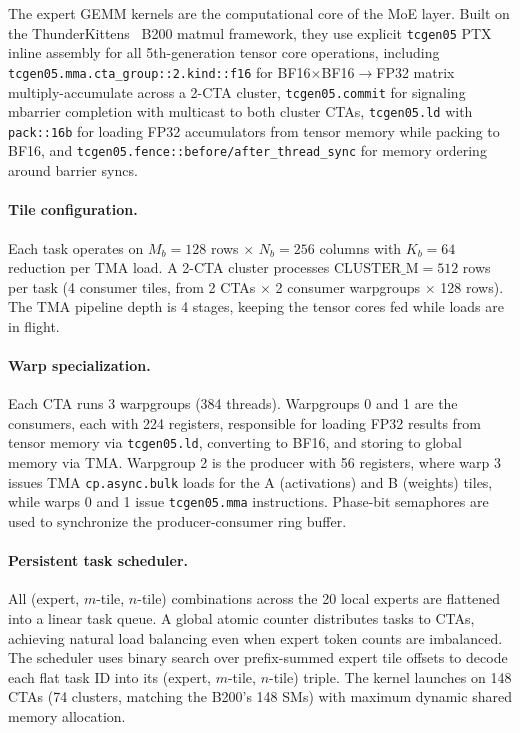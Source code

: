 \documentclass[sigplan,screen]{acmart}
\begin{document}
The expert \newline GEMM kernels are the computational core of the MoE layer. Built on the ThunderKittens~\cite{thunderkittens} B200 matmul framework, they use explicit \texttt{tcgen05} PTX inline assembly for all 5th-generation tensor core operations, including \newline \texttt{tcgen05.mma.cta\_group::2.kind::f16} \newline for BF16$\times$BF16$\rightarrow$FP32 matrix multiply-accumulate across a 2-CTA cluster, \texttt{tcgen05.commit} for signaling mbarrier completion with multicast to both cluster CTAs, \texttt{tcgen05.ld} with \texttt{pack::16b} for loading FP32 accumulators from tensor memory while packing to BF16, and \newline \texttt{tcgen05.fence::before/after\_thread\_sync} for memory ordering around barrier syncs.

\paragraph{Tile configuration.} Each task operates on $M_b = 128$ rows $\times$ $N_b = 256$ columns with $K_b = 64$ reduction per TMA load. A 2-CTA cluster processes $\text{CLUSTER\_M} = 512$ rows per task (4 consumer tiles, from 2 CTAs $\times$ 2 consumer warpgroups $\times$ 128 rows). The TMA pipeline depth is 4 stages, keeping the tensor cores fed while loads are in flight.

\paragraph{Warp specialization.} Each CTA runs 3 warpgroups (384 threads). Warpgroups 0 and 1 are the consumers, each with 224 registers, responsible for loading FP32 results from tensor memory via \texttt{tcgen05.ld}, converting to BF16, and storing to global memory via TMA. Warpgroup 2 is the producer with 56 registers, where warp 3 issues TMA \texttt{cp.async.bulk} loads for the A (activations) and B (weights) tiles, while warps 0 and 1 issue \texttt{tcgen05.mma} instructions. Phase-bit semaphores are used to synchronize the producer-consumer ring buffer.

\paragraph{Persistent task scheduler.} All (expert, $m$-tile, $n$-tile) combinations across the 20 local experts are flattened into a linear task queue. A global atomic counter distributes tasks to CTAs, achieving natural load balancing even when expert token counts are imbalanced. The scheduler uses binary search over prefix-summed expert tile offsets to decode each flat task ID into its (expert, $m$-tile, $n$-tile) triple. The kernel launches on 148 CTAs (74 clusters, matching the B200's 148 SMs) with maximum dynamic shared memory allocation.
\end{document}
